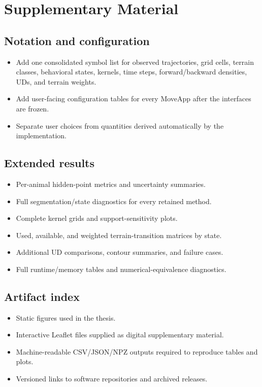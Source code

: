 \chapter{Supplementary Material}
\label{app:supplementary}

\section{Notation and configuration}

\begin{itemize}
  \item Add one consolidated symbol list for observed trajectories, grid cells, terrain classes, behavioral states, kernels, time steps, forward/backward densities, UDs, and terrain weights.
  \item Add user-facing configuration tables for every MoveApp after the interfaces are frozen.
  \item Separate user choices from quantities derived automatically by the implementation.
\end{itemize}

\section{Extended results}

\begin{itemize}
  \item Per-animal hidden-point metrics and uncertainty summaries.
  \item Full segmentation/state diagnostics for every retained method.
  \item Complete kernel grids and support-sensitivity plots.
  \item Used, available, and weighted terrain-transition matrices by state.
  \item Additional UD comparisons, contour summaries, and failure cases.
  \item Full runtime/memory tables and numerical-equivalence diagnostics.
\end{itemize}

\section{Artifact index}

\begin{itemize}
  \item Static figures used in the thesis.
  \item Interactive Leaflet files supplied as digital supplementary material.
  \item Machine-readable CSV/JSON/NPZ outputs required to reproduce tables and plots.
  \item Versioned links to software repositories and archived releases.
\end{itemize}
